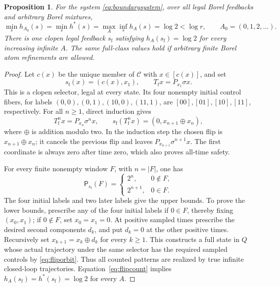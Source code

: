 \documentclass[11pt,reqno]{amsart}
\numberwithin{equation}{section}
\newtheorem{proposition}[theorem]{Proposition}
\theoremstyle{definition}
\theoremstyle{remark}
\newcommand{\Patt}{\mathsf P}
\newcommand{\hpat}{h^{*}}
\begin{document}
\begin{proposition}\label{prop:boundary}
For the system \eqref{eq:boundarysystem}, over all legal Borel feedbacks
and arbitrary Borel mixtures,
\begin{equation}\label{eq:boundaryvalue}
 \min_s h_{A_0}(s)=\min_s\hpat(s)=
 \max_A\inf_s h_A(s)=\log2<\log r,
 \qquad A_0=(0,1,2,\ldots).
\end{equation}
There is one clopen legal feedback $s_{\mathrm f}$ satisfying
$h_A(s_{\mathrm f})=\log2$ for every increasing infinite $A$.
The same full-class values hold if arbitrary finite Borel atom
refinements are allowed.
\end{proposition}
\begin{proof}
Let $c(x)$ be the unique member of $\mathcal C$ with $x\in[c(x)]$,
and set
\[
 s_{\mathrm f}(x)=(c(x),x_1),\qquad
 T_{\mathrm f}x=P_{x_1}\sigma x.
\]
This is a clopen selector, legal at every state. Its four nonempty
initial control fibers, for labels $(0,0),(0,1),(10,0),(11,1)$, are
$[00],[01],[10],[11]$, respectively. For all $n\ge1$, direct induction
gives
\begin{equation}\label{eq:fliporbit}
 T_{\mathrm f}^n x=P_{x_n}\sigma^n x,
 \qquad s_{\mathrm f}(T_{\mathrm f}^n x)
        =(0,x_{n+1}\mathbin\oplus x_n),
\end{equation}
where $\oplus$ is addition modulo two. In the induction step the
chosen flip is $x_{n+1}\oplus x_n$; it cancels the previous flip and
leaves $P_{x_{n+1}}\sigma^{n+1}x$. The first coordinate is always zero
after time zero, which also proves all-time safety.

For every finite nonempty window $F$, with $n=|F|$, one has
\begin{equation}\label{eq:flipcount}
 \Patt_{s_{\mathrm f}}(F)=
 \begin{cases}2^n,&0\notin F,\\2^{n+1},&0\in F.\end{cases}
\end{equation}
The four initial labels and two later labels give the upper bounds.
To prove the lower bounds, prescribe any of the four initial labels
if $0\in F$, thereby fixing $(x_0,x_1)$; if $0\notin F$, set
$x_0=x_1=0$. At positive sampled times prescribe the desired second
components $d_k$, and put $d_k=0$ at the other positive times.
Recursively set $x_{k+1}=x_k\oplus d_k$ for every $k\ge1$.
This constructs a full state in $Q$ whose actual trajectory under the
same selector has the required sampled controls by
\eqref{eq:fliporbit}. Thus all counted patterns are realized by true
infinite closed-loop trajectories. Equation~\eqref{eq:flipcount}
implies $h_A(s_{\mathrm f})=\hpat(s_{\mathrm f})=\log2$ for every $A$.


\end{proof}
\end{document}
